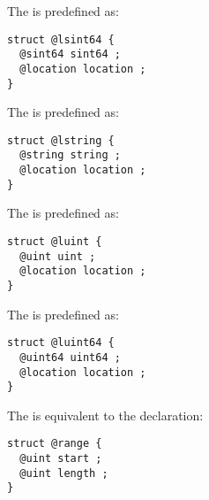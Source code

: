 
The  is predefined as:
\begin{lstlisting}[language=galgas]
struct @lsint64 {
  @sint64 sint64 ;
  @location location ;
}
\end{lstlisting}








The  is predefined as:
\begin{lstlisting}[language=galgas]
struct @lstring {
  @string string ;
  @location location ;
}
\end{lstlisting}








The  is predefined as:
\begin{lstlisting}[language=galgas]
struct @luint {
  @uint uint ;
  @location location ;
}
\end{lstlisting}






The  is predefined as:
\begin{lstlisting}[language=galgas]
struct @luint64 {
  @uint64 uint64 ;
  @location location ;
}
\end{lstlisting}



The  is equivalent to the declaration:
\begin{lstlisting}[language=galgas]
struct @range {
  @uint start ;
  @uint length ;
}
\end{lstlisting}


